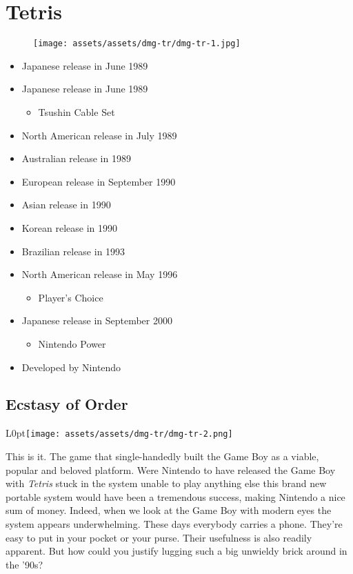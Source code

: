 \documentclass{book}
\begin{document}
\chapter*{Tetris}
\vspace{\baselineskip}\begin{figure}[H]{\texttt{[image: assets/assets/dmg-tr/dmg-tr-1.jpg]}}\end{figure}\vspace{\baselineskip}
\begin{itemize}[left=0pt, nosep]
\item Japanese release in June 1989
\item Japanese release in June 1989
\begin{itemize}
\item Tsushin Cable Set
\end{itemize}
\item North American release in July 1989
\item Australian release in 1989
\item European release in September 1990
\item Asian release in 1990
\item Korean release in 1990
\item Brazilian release in 1993
\item North American release in May 1996
\begin{itemize}
\item Player’s Choice
\end{itemize}
\item Japanese release in September 2000
\begin{itemize}
\item Nintendo Power
\end{itemize}
\item Developed by Nintendo

\end{itemize}
\newpage\FloatBarrier\section*{Ecstasy of Order}
\begin{wrapfigure}{L}{0pt}{\texttt{[image: assets/assets/dmg-tr/dmg-tr-2.png]}}\end{wrapfigure}\noindent
This is it. The game that single-handedly built the Game Boy as a viable, popular and beloved platform. Were Nintendo to have released the Game Boy with \emph{Tetris} stuck in the system unable to play anything else this brand new portable system would have been a tremendous success, making Nintendo a nice sum of money. Indeed, when we look at the Game Boy with modern eyes the system appears underwhelming. These days everybody carries a phone. They’re easy to put in your pocket or your purse. Their usefulness is also readily apparent. But how could you justify lugging such a big unwieldy brick around in the ’90s?\par
\end{document}
